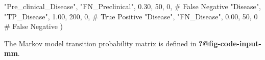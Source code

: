 \documentclass[
]{article}
\newenvironment{Shaded}{\begin{snugshade}}{\end{snugshade}}
\newcommand{\CommentTok}[1]{\textcolor[rgb]{0.37,0.37,0.37}{#1}}
\newcommand{\DecValTok}[1]{\textcolor[rgb]{0.68,0.00,0.00}{#1}}
\newcommand{\FloatTok}[1]{\textcolor[rgb]{0.68,0.00,0.00}{#1}}
\newcommand{\NormalTok}[1]{\textcolor[rgb]{0.00,0.23,0.31}{#1}}
\newcommand{\StringTok}[1]{\textcolor[rgb]{0.13,0.47,0.30}{#1}}
\begin{document}
\begin{Shaded}
\begin{Highlighting}[]
  \StringTok{"Pre\_clinical\_Disease"}\NormalTok{, }\StringTok{"FN\_Preclinical"}\NormalTok{,       }\FloatTok{0.30}\NormalTok{,     }\DecValTok{50}\NormalTok{,    }\DecValTok{0}\NormalTok{,  }\CommentTok{\# False Negative}
  \StringTok{"Disease"}\NormalTok{,              }\StringTok{"TP\_Disease"}\NormalTok{,           }\FloatTok{1.00}\NormalTok{,    }\DecValTok{200}\NormalTok{,    }\DecValTok{0}\NormalTok{,  }\CommentTok{\# True Positive}
  \StringTok{"Disease"}\NormalTok{,              }\StringTok{"FN\_Disease"}\NormalTok{,           }\FloatTok{0.00}\NormalTok{,     }\DecValTok{50}\NormalTok{,    }\DecValTok{0}   \CommentTok{\# False Negative}
\NormalTok{)}
\end{Highlighting}
\end{Shaded}

The Markov model transition probability matrix is defined in
\textbf{?@fig-code-input-mm}.
\end{document}
